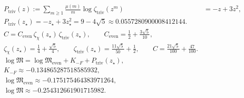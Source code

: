 \[
\begin{aligned}
P_{\mathrm{triv}}(z):=\sum_{m\ge 1}\frac{\mu(m)}{m}\log\zeta_{\mathrm{triv}}(z^m)&=-z+3z^2,
\\
P_{\mathrm{triv}}(z_\star)=-z_\star+3z_\star^2=9 - 4 \sqrt{5}\approx 0.0557280900008412144.
\\[2pt]
C=C_{\mathrm{even}}\,\zeta_{\chi}(z_\star)\,\zeta_{\mathrm{triv}}(z_\star),\qquad C_{\mathrm{even}}=\frac{1}{2} + \frac{3 \sqrt{5}}{10},
\\
\zeta_\chi(z_\star)=\frac{1}{4} + \frac{\sqrt{5}}{4},\qquad\zeta_{\mathrm{triv}}(z_\star)=\frac{11 \sqrt{5}}{50} + \frac{1}{2},\qquad C=\frac{21 \sqrt{5}}{100} + \frac{47}{100}.
\\[2pt]
\log\mathfrak{M}=\log\mathfrak{M}_{\mathrm{even}}+K_{-F}+P_{\mathrm{triv}}(z_\star),
\\
K_{-F}\approx -0.134865287518585932,
\\
\log\mathfrak{M}_{\mathrm{even}}\approx -0.175175464383971264,
\\
\log\mathfrak{M}\approx -0.254312661901715982.
\end{aligned}
\]
